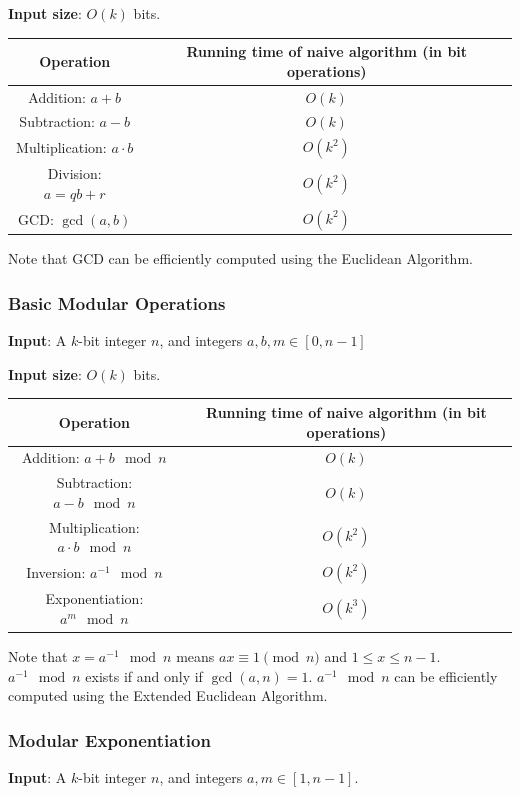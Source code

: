 \documentclass[12pt,titlepage]{article}
\begin{document}
\textbf{Input size}: $O(k)$ bits.

\begin{center}
\begin{tabular}{c|c}
	\hline
	Operation & Running time of naive algorithm (in bit operations)\\
	\hline
	Addition: $a + b$ & $O(k)$\\
	Subtraction: $a - b$ & $O(k)$\\
	Multiplication: $a \cdot b$ & $O(k^2)$\\
	Division: $a = qb + r$ & $O(k^2)$\\
	\hline
	GCD: $\gcd(a, b)$ & $O(k^2)$\\
	\hline
\end{tabular}
\end{center}

Note that GCD can be efficiently computed using the Euclidean Algorithm.

\subsubsection{Basic Modular Operations}
\textbf{Input}: A $k$-bit integer $n$, and integers $a, b, m \in [0, n-1]$

\textbf{Input size}: $O(k)$ bits.

\begin{center}
\begin{tabular}{c|c}
	\hline
	Operation & Running time of naive algorithm (in bit operations)\\
	\hline
	Addition: $a + b \mod n$ & $O(k)$\\
	Subtraction: $a - b \mod n$ & $O(k)$\\
	Multiplication: $a \cdot b \mod n$ & $O(k^2)$\\
	Inversion: $a^{-1} \mod n$ & $O(k^2)$\\
	Exponentiation: $a^m \mod n$ & $O(k^3)$\\
	\hline
\end{tabular}
\end{center}

Note that $x = a^{-1} \mod n$ means $ax \equiv 1 \pmod n$ and $1 \leq x \leq n-1$. $a^{-1} \mod n$ exists if and only if $\gcd(a, n) = 1$. $a^{-1} \mod n$ can be efficiently computed using the Extended Euclidean Algorithm.

\subsubsection{Modular Exponentiation}
\textbf{Input}: A $k$-bit integer $n$, and integers $a, m \in [1, n - 1]$.
\end{document}
